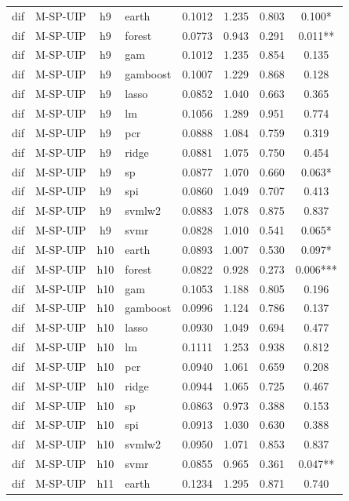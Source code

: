 \begin{ThreePartTable}
\begin{longtable}[t]{llclcccc}
\addlinespace
dif & M-SP-UIP & h9 & earth & 0.1012 & 1.235 & 0.803 & 0.100*\\
dif & M-SP-UIP & h9 & forest & 0.0773 & 0.943 & 0.291 & 0.011**\\
dif & M-SP-UIP & h9 & gam & 0.1012 & 1.235 & 0.854 & 0.135\\
dif & M-SP-UIP & h9 & gamboost & 0.1007 & 1.229 & 0.868 & 0.128\\
dif & M-SP-UIP & h9 & lasso & 0.0852 & 1.040 & 0.663 & 0.365\\
dif & M-SP-UIP & h9 & lm & 0.1056 & 1.289 & 0.951 & 0.774\\
dif & M-SP-UIP & h9 & pcr & 0.0888 & 1.084 & 0.759 & 0.319\\
dif & M-SP-UIP & h9 & ridge & 0.0881 & 1.075 & 0.750 & 0.454\\
dif & M-SP-UIP & h9 & sp & 0.0877 & 1.070 & 0.660 & 0.063*\\
dif & M-SP-UIP & h9 & spi & 0.0860 & 1.049 & 0.707 & 0.413\\
dif & M-SP-UIP & h9 & svmlw2 & 0.0883 & 1.078 & 0.875 & 0.837\\
dif & M-SP-UIP & h9 & svmr & 0.0828 & 1.010 & 0.541 & 0.065*\\
\addlinespace
dif & M-SP-UIP & h10 & earth & 0.0893 & 1.007 & 0.530 & 0.097*\\
dif & M-SP-UIP & h10 & forest & 0.0822 & 0.928 & 0.273 & 0.006***\\
dif & M-SP-UIP & h10 & gam & 0.1053 & 1.188 & 0.805 & 0.196\\
dif & M-SP-UIP & h10 & gamboost & 0.0996 & 1.124 & 0.786 & 0.137\\
dif & M-SP-UIP & h10 & lasso & 0.0930 & 1.049 & 0.694 & 0.477\\
dif & M-SP-UIP & h10 & lm & 0.1111 & 1.253 & 0.938 & 0.812\\
dif & M-SP-UIP & h10 & pcr & 0.0940 & 1.061 & 0.659 & 0.208\\
dif & M-SP-UIP & h10 & ridge & 0.0944 & 1.065 & 0.725 & 0.467\\
dif & M-SP-UIP & h10 & sp & 0.0863 & 0.973 & 0.388 & 0.153\\
dif & M-SP-UIP & h10 & spi & 0.0913 & 1.030 & 0.630 & 0.388\\
dif & M-SP-UIP & h10 & svmlw2 & 0.0950 & 1.071 & 0.853 & 0.837\\
dif & M-SP-UIP & h10 & svmr & 0.0855 & 0.965 & 0.361 & 0.047**\\
\addlinespace
dif & M-SP-UIP & h11 & earth & 0.1234 & 1.295 & 0.871 & 0.740\\

\end{longtable}
\end{ThreePartTable}
